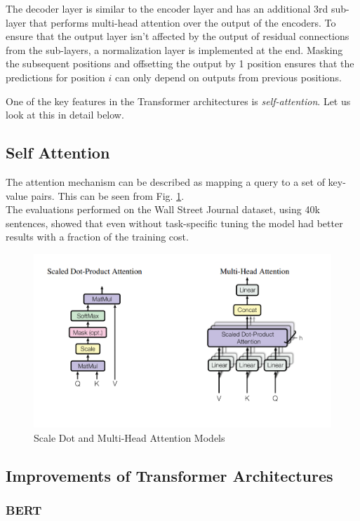 \documentclass[12pt]{report}
\begin{document}
			The decoder layer is similar to the encoder layer and has an additional 3rd sub-layer that performs multi-head attention over the output of the encoders. To ensure that the output layer isn't affected by the output of residual connections from the sub-layers, a normalization layer is implemented at the end. Masking the subsequent positions and offsetting the output by 1 position ensures that the predictions for position $ i $ can only depend on outputs from previous positions.

			One of the key features in the Transformer architectures is \textit{self-attention}. Let us look at this in detail below.
			\subsection{Self Attention}\label{231}
			The attention mechanism can be described as mapping a query to a set of key-value pairs. This can be seen from Fig. \ref{multiHeadAttention}. \\The evaluations performed on the Wall Street Journal dataset\citep{wsj}, using 40k sentences, showed that even without task-specific tuning the model had better results with a fraction of the training cost.
			\begin{figure}[h!]
				\centering
				\includegraphics[scale=0.4]{../images/multihead.png}
				\caption{Scale Dot and Multi-Head Attention Models \cite{atayl}}\label{multiHeadAttention}
			\end{figure}

		\subsection{Improvements of Transformer Architectures}\label{232}

		\subsubsection{BERT}\label{2321}
\end{document}
